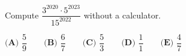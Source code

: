 Compute $\dfrac{3^{2020}\cdot5^{2023}}{15^{2022}}$ without a calculator.

$\textbf{(A) }\dfrac59\qquad\textbf{(B) }\dfrac67\qquad\textbf{(C) }\dfrac53\qquad\textbf{(D) }\dfrac11\qquad\textbf{(E) }\dfrac47$
